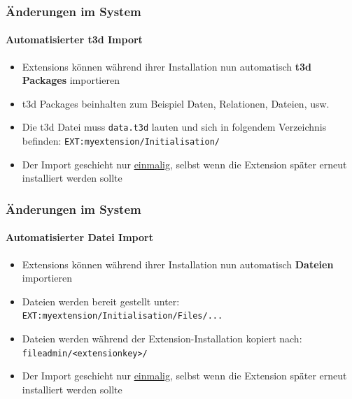 
\begin{frame}[fragile]
	\frametitle{Änderungen im System}
	\framesubtitle{Automatisierter t3d Import}

	\begin{itemize}
		\item Extensions können während ihrer Installation nun automatisch\newline
			\textbf{t3d Packages} importieren
		\item t3d Packages beinhalten zum Beispiel Daten, Relationen, Dateien, usw.
		\item Die t3d Datei muss \texttt{data.t3d} lauten und sich in folgendem Verzeichnis befinden:
			\texttt{EXT:myextension/Initialisation/}
		\item Der Import geschieht nur \underline{einmalig}, selbst wenn die Extension später erneut installiert werden sollte
	\end{itemize}

\end{frame}


\begin{frame}[fragile]
	\frametitle{Änderungen im System}
	\framesubtitle{Automatisierter Datei Import}

	\begin{itemize}
		\item Extensions können während ihrer Installation nun automatisch\newline
			\textbf{Dateien} importieren
		\item Dateien werden bereit gestellt unter:\newline
			\texttt{EXT:myextension/Initialisation/Files/...}
		\item Dateien werden während der Extension-Installation kopiert nach:\newline
			\texttt{fileadmin/<extensionkey>/}
		\item Der Import geschieht nur \underline{einmalig}, selbst wenn die Extension später erneut installiert werden sollte
	\end{itemize}

\end{frame}

